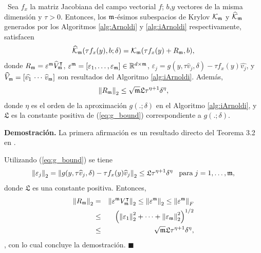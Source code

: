 \begin{theorem} \label{theorem:krilobapproxequality} \cite{naranjo2023jacobian}~Sea $f_x$ la matriz Jacobiana del campo vectorial $f$; $b$,$y$ vectores de la misma dimensión y $\tau>0$. Entonces, los $\mathfrak{m}$-ésimos subespacios de Krylov $\mathcal{K}_{\mathfrak{m}}$ y $\widehat{\mathcal{K}}_{\mathfrak{m}}$ generados por los Algoritmos \ref{alg:Arnoldi} y \ref{alg:iArnoldi} respectivamente, satisfacen 
	\[ \widehat{\mathcal{K}}_{\mathfrak{m}}(\tau f_x(y),b;\delta) = \mathcal{K}_{\mathfrak{m}}(\tau f_x(y)+R_{\mathfrak{m}},b), \]
	donde $R_{\mathfrak{m}} =  \varepsilon^{\mathfrak{m}}\widehat{V}^\intercal_{\mathfrak{m}}$,  
	$\varepsilon^{\mathfrak{m}} = [\varepsilon_1,\dots,\varepsilon_{\mathfrak{m}}] \in \mathbb{R}^{d\times \mathfrak{m}}$, $\varepsilon_j = g(y,\tau\widehat{v}_j,\delta)- \tau f_x(y)\widehat{v_j}$, y $\widehat{V}_{\mathfrak{m}}=[\widehat{v_1}\,\cdots \,\widehat{v}_{\mathfrak{m}}]$ son resultados del Algoritmo \ref{alg:iArnoldi}. Además, 
	\[ \left\lVert R_{\mathfrak{m}} \right\rVert_2\leq \sqrt{\mathfrak{m}}\mathfrak{L} \tau^{\eta+1}\delta^{\eta}, \]
	donde $\eta$ es el orden de la aproximación $g(.;\delta)$ en el Algoritmo \ref{alg:iArnoldi}, y $\mathfrak{L}$ es la constante positiva de (\ref{eq:g_bound}) correspondiente a $g(.;\delta)$.
\end{theorem}
\textbf{Demostración.} La primera afirmación es un resultado directo del Teorema 3.2 en \cite{brown1987local}.

Utilizando  (\ref{eq:g_bound}) se tiene
\[ \left\lVert \varepsilon_j \right\rVert_2=\left\lVert g(y,\tau\widehat{v}_j,\delta)-\tau f_x(y)\widehat{v}_j \right\rVert_2 \leq  \mathfrak{L} \tau^{\eta+1}\delta^{\eta}\;\;\;\text{para}\;j=1,\dots,\mathfrak{m}, \]
donde $\mathfrak{L}$ es una constante positiva. Entonces, 
\begin{eqnarray*}
	\left\lVert R_{\mathfrak{m}} \right\rVert_2 & = & \left\lVert \varepsilon^{\mathfrak{m}} V_{\mathfrak{m}}^\intercal \right\rVert_2\leq\left\lVert \varepsilon^{\mathfrak{m}} \right\rVert_2\leq \left\lVert \varepsilon^{\mathfrak{m}} \right\rVert_F \\
	& \leq & \left( \left\lVert \varepsilon_1 \right\rVert_2^2 + \cdots + \left\lVert \varepsilon_{\mathfrak{m}} \right\rVert_2^2 \right)^{1/2} \\
	& \leq & \sqrt{\mathfrak{m}}\mathfrak{L} \tau^{\eta+1}\delta^{\eta},
\end{eqnarray*}
, con lo cual concluye la demostración. $\blacksquare$\\

